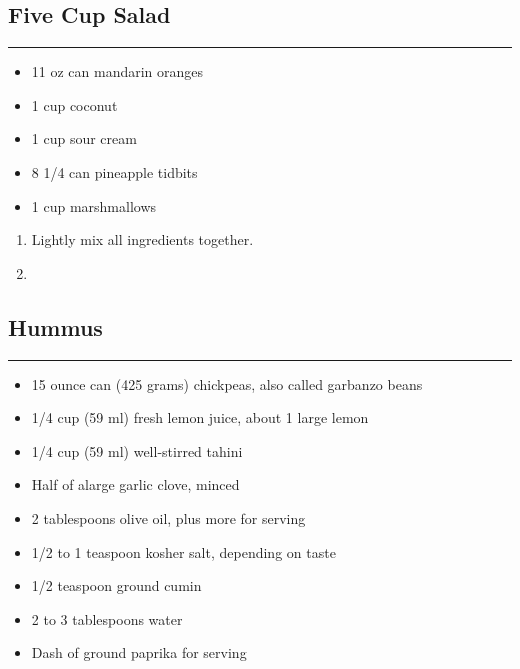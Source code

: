 \documentclass{article}
\begin{document}
\subsection{Five Cup Salad} 
\noindent\rule[0.5ex]{\linewidth}{1pt}

\begin{framed}
    \begin{itemize}
        \item 11 oz can mandarin oranges
        \item 1 cup coconut
        \item 1 cup sour cream
        \item 8 1/4 can pineapple tidbits
        \item 1 cup marshmallows
    \end{itemize}
\end{framed}

\begin{enumerate}
    \item 
        Lightly mix all ingredients together.
    \item
\end{enumerate}
\newpage

\subsection{Hummus} 
\noindent\rule[0.5ex]{\linewidth}{1pt}

\begin{framed}
    \begin{itemize}
        \item 15 ounce can (425 grams) chickpeas, also called garbanzo beans
        \item 1/4 cup (59 ml) fresh lemon juice, about 1 large lemon
        \item 1/4 cup (59 ml) well-stirred tahini
        \item Half of alarge garlic clove, minced
        \item 2 tablespoons olive oil, plus more for serving
        \item 1/2 to 1 teaspoon kosher salt, depending on taste
        \item 1/2 teaspoon ground cumin
        \item 2 to 3 tablespoons water
        \item Dash of ground paprika for serving
    \end{itemize}
\end{framed}
\end{document}
